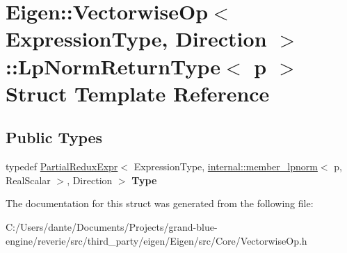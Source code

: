 \hypertarget{struct_eigen_1_1_vectorwise_op_1_1_lp_norm_return_type}{}\section{Eigen\+::Vectorwise\+Op$<$ Expression\+Type, Direction $>$\+::Lp\+Norm\+Return\+Type$<$ p $>$ Struct Template Reference}
\label{struct_eigen_1_1_vectorwise_op_1_1_lp_norm_return_type}
\subsection*{Public Types}
\begin{DoxyCompactItemize}
\item 
\mbox{\label{struct_eigen_1_1_vectorwise_op_1_1_lp_norm_return_type_aff25bd2bad22a9518a282ea07f54b6df}} 
typedef \mbox{\hyperlink{class_eigen_1_1_partial_redux_expr}{Partial\+Redux\+Expr}}$<$ Expression\+Type, \mbox{\hyperlink{struct_eigen_1_1internal_1_1member__lpnorm}{internal\+::member\+\_\+lpnorm}}$<$ p, Real\+Scalar $>$, Direction $>$ {\bfseries Type}
\end{DoxyCompactItemize}


The documentation for this struct was generated from the following file\+:\begin{DoxyCompactItemize}
\item 
C\+:/\+Users/dante/\+Documents/\+Projects/grand-\/blue-\/engine/reverie/src/third\+\_\+party/eigen/\+Eigen/src/\+Core/Vectorwise\+Op.\+h\end{DoxyCompactItemize}
